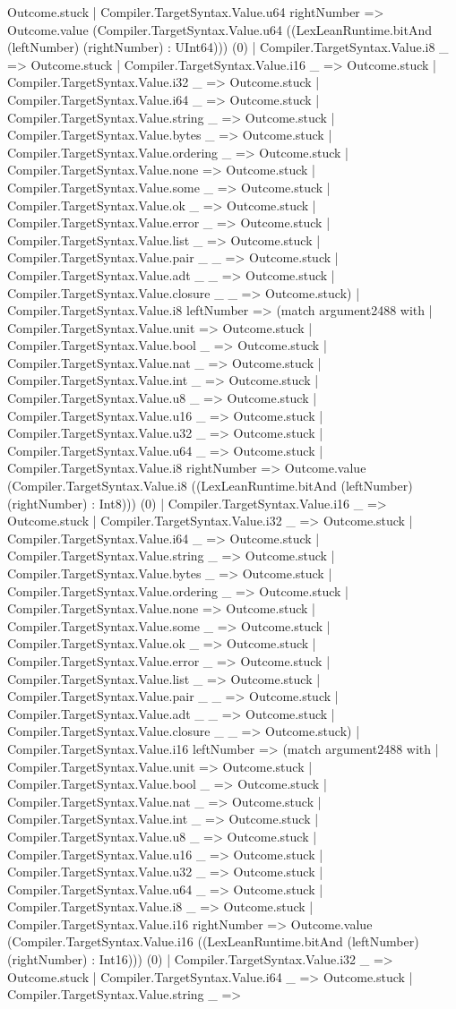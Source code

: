 \documentclass[11pt]{article}
\begin{document}
Outcome.stuck | Compiler.TargetSyntax.Value.u64 rightNumber => Outcome.value (Compiler.TargetSyntax.Value.u64 ((LexLeanRuntime.bitAnd (leftNumber) (rightNumber) : UInt64))) (0) | Compiler.TargetSyntax.Value.i8 \_ => Outcome.stuck | Compiler.TargetSyntax.Value.i16 \_ => Outcome.stuck | Compiler.TargetSyntax.Value.i32 \_ => Outcome.stuck | Compiler.TargetSyntax.Value.i64 \_ => Outcome.stuck | Compiler.TargetSyntax.Value.string \_ => Outcome.stuck | Compiler.TargetSyntax.Value.bytes \_ => Outcome.stuck | Compiler.TargetSyntax.Value.ordering \_ => Outcome.stuck | Compiler.TargetSyntax.Value.none => Outcome.stuck | Compiler.TargetSyntax.Value.some \_ => Outcome.stuck | Compiler.TargetSyntax.Value.ok \_ => Outcome.stuck | Compiler.TargetSyntax.Value.error \_ => Outcome.stuck | Compiler.TargetSyntax.Value.list \_ => Outcome.stuck | Compiler.TargetSyntax.Value.pair \_ \_ => Outcome.stuck | Compiler.TargetSyntax.Value.adt \_ \_ => Outcome.stuck | Compiler.TargetSyntax.Value.closure \_ \_ => Outcome.stuck) | Compiler.TargetSyntax.Value.i8 leftNumber => (match argument2488 with | Compiler.TargetSyntax.Value.unit => Outcome.stuck | Compiler.TargetSyntax.Value.bool \_ => Outcome.stuck | Compiler.TargetSyntax.Value.nat \_ => Outcome.stuck | Compiler.TargetSyntax.Value.int \_ => Outcome.stuck | Compiler.TargetSyntax.Value.u8 \_ => Outcome.stuck | Compiler.TargetSyntax.Value.u16 \_ => Outcome.stuck | Compiler.TargetSyntax.Value.u32 \_ => Outcome.stuck | Compiler.TargetSyntax.Value.u64 \_ => Outcome.stuck | Compiler.TargetSyntax.Value.i8 rightNumber => Outcome.value (Compiler.TargetSyntax.Value.i8 ((LexLeanRuntime.bitAnd (leftNumber) (rightNumber) : Int8))) (0) | Compiler.TargetSyntax.Value.i16 \_ => Outcome.stuck | Compiler.TargetSyntax.Value.i32 \_ => Outcome.stuck | Compiler.TargetSyntax.Value.i64 \_ => Outcome.stuck | Compiler.TargetSyntax.Value.string \_ => Outcome.stuck | Compiler.TargetSyntax.Value.bytes \_ => Outcome.stuck | Compiler.TargetSyntax.Value.ordering \_ => Outcome.stuck | Compiler.TargetSyntax.Value.none => Outcome.stuck | Compiler.TargetSyntax.Value.some \_ => Outcome.stuck | Compiler.TargetSyntax.Value.ok \_ => Outcome.stuck | Compiler.TargetSyntax.Value.error \_ => Outcome.stuck | Compiler.TargetSyntax.Value.list \_ => Outcome.stuck | Compiler.TargetSyntax.Value.pair \_ \_ => Outcome.stuck | Compiler.TargetSyntax.Value.adt \_ \_ => Outcome.stuck | Compiler.TargetSyntax.Value.closure \_ \_ => Outcome.stuck) | Compiler.TargetSyntax.Value.i16 leftNumber => (match argument2488 with | Compiler.TargetSyntax.Value.unit => Outcome.stuck | Compiler.TargetSyntax.Value.bool \_ => Outcome.stuck | Compiler.TargetSyntax.Value.nat \_ => Outcome.stuck | Compiler.TargetSyntax.Value.int \_ => Outcome.stuck | Compiler.TargetSyntax.Value.u8 \_ => Outcome.stuck | Compiler.TargetSyntax.Value.u16 \_ => Outcome.stuck | Compiler.TargetSyntax.Value.u32 \_ => Outcome.stuck | Compiler.TargetSyntax.Value.u64 \_ => Outcome.stuck | Compiler.TargetSyntax.Value.i8 \_ => Outcome.stuck | Compiler.TargetSyntax.Value.i16 rightNumber => Outcome.value (Compiler.TargetSyntax.Value.i16 ((LexLeanRuntime.bitAnd (leftNumber) (rightNumber) : Int16))) (0) | Compiler.TargetSyntax.Value.i32 \_ => Outcome.stuck | Compiler.TargetSyntax.Value.i64 \_ => Outcome.stuck | Compiler.TargetSyntax.Value.string \_ => 
\end{document}
